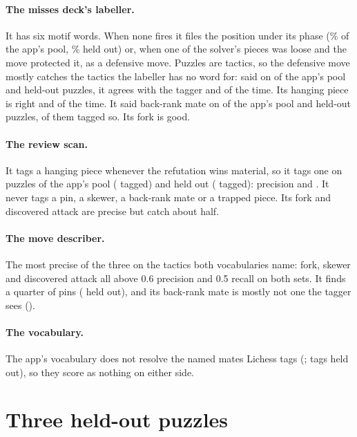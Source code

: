 \documentclass[11pt]{article}
\begin{document}
\paragraph{The misses deck's labeller.} It has six motif words. When none fires it files the
position under its phase (\PhaseShareApp\% of the app's pool, \PhaseShareHeld\% held out) or, when
one of the solver's pieces was loose and the move protected it, as a defensive move. Puzzles
are tactics, so the defensive move mostly catches the tactics the labeller has no word for:
said on \DefSaidApp{} of the app's pool and \DefSaidHeld{} held-out puzzles, it agrees with the
tagger \DefPrecApp{} and \DefPrecHeld{} of the time. Its hanging piece is right \BestHangPrecApp{}
and \BestHangPrecHeld{} of the time. It said back-rank mate on \BrmSaidApp{} of the app's pool
and \BrmSaidHeld{} held-out puzzles, \BrmTpHeld{} of them tagged so. Its fork is good.

\paragraph{The review scan.} It tags a hanging piece whenever the refutation wins material, so
it tags one on \HangSaidApp{} puzzles of the app's pool (\HangRealApp{} tagged) and \HangSaidHeld{}
held out (\HangRealHeld{} tagged): precision \HangPrecApp{} and \HangPrecHeld. It never tags a
pin, a skewer, a back-rank mate or a trapped piece. Its fork and discovered attack are precise
but catch about half.

\paragraph{The move describer.} The most precise of the three on the tactics both
vocabularies name: fork, skewer and discovered attack all above 0.6 precision and 0.5 recall on
both sets. It finds a quarter of pins (\MovePinRecHeld{} held out), and its back-rank mate is
mostly not one the tagger sees (\MoveBrmPrecHeld).

\paragraph{The vocabulary.} The app's vocabulary does not resolve the named mates Lichess
tags (\NamedMates; \NamedMateTags{} tags held out), so they score as nothing on either side.

\section{Three held-out puzzles}\label{sec:boards}
\end{document}

